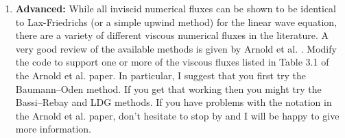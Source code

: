 \documentclass[11pt]{article}
\begin{document}
\begin{enumerate}
\item {\bf Advanced:} While all inviscid numerical fluxes can be shown to be
identical to Lax-Friedrichs (or a simple upwind method) for the linear wave
equation, there are a variety of different viscous numerical fluxes in the
literature.  A very good review of the available methods is given by Arnold et
al. \cite{Arnold.etal:2001}.  Modify the code to support one or more of the
viscous fluxes listed in Table 3.1 of the Arnold et al. paper.  In particular,
I suggest that you first try the Baumann--Oden method.  If you get that
working then you might try the Bassi--Rebay and LDG methods.  If you have
problems with the notation in the Arnold et al. paper, don't hesitate to stop
by and I will be happy to give more information.
\end{enumerate}



\end{document}
